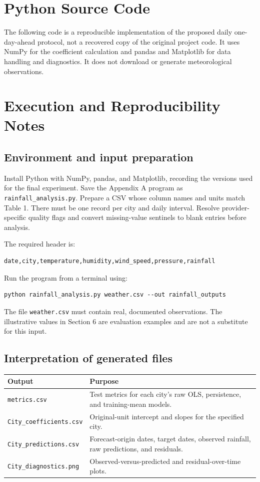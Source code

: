 \documentclass[11pt,a4paper]{article}
\begin{document}
\appendix
\clearpage
\section{Python Source Code}
The following code is a reproducible implementation of the proposed daily one-day-ahead protocol, not a recovered copy of the original project code. It uses NumPy for the coefficient calculation and pandas and Matplotlib for data handling and diagnostics. It does not download or generate meteorological observations.


\clearpage
\section{Execution and Reproducibility Notes}
\subsection{Environment and input preparation}
Install Python with NumPy, pandas, and Matplotlib, recording the versions used for the final experiment. Save the Appendix A program as \texttt{rainfall\_analysis.py}. Prepare a CSV whose column names and units match Table 1. There must be one record per city and daily interval. Resolve provider-specific quality flags and convert missing-value sentinels to blank entries before analysis.

The required header is:
\begin{lstlisting}[language={}]
date,city,temperature,humidity,wind_speed,pressure,rainfall
\end{lstlisting}
Run the program from a terminal using:
\begin{lstlisting}[language={}]
python rainfall_analysis.py weather.csv --out rainfall_outputs
\end{lstlisting}
The file \texttt{weather.csv} must contain real, documented observations. The illustrative values in Section 6 are evaluation examples and are not a substitute for this input.

\subsection{Interpretation of generated files}
\begin{tabularx}{\textwidth}{@{}lX@{}}\toprule
Output & Purpose\\\midrule
\texttt{metrics.csv} & Test metrics for each city's raw OLS, persistence, and training-mean models.\\
\texttt{City\_coefficients.csv} & Original-unit intercept and slopes for the specified city.\\
\texttt{City\_predictions.csv} & Forecast-origin dates, target dates, observed rainfall, raw predictions, and residuals.\\
\texttt{City\_diagnostics.png} & Observed-versus-predicted and residual-over-time plots.\\\bottomrule
\end{tabularx}
\end{document}
